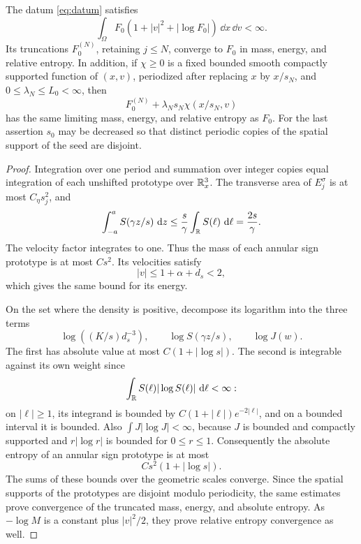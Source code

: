 \begin{lemma}
\label{lem:datum}
The datum \eqref{eq:datum} satisfies
\[
 \int_\Omega F_0(1+|v|^2+|\log F_0|)\,\dd x\,\dd v<\infty .
\]
Its truncations \(F_0^{(N)}\), retaining \(j\le N\), converge to
\(F_0\) in mass, energy, and relative entropy.
In addition, if \(\chi\ge0\) is a fixed bounded smooth compactly
supported function of \((x,v)\), periodized after replacing \(x\)
by \(x/s_N\), and \(0\le\lambda_N\le L_0<\infty\), then
\[
 F_0^{(N)}+\lambda_Ns_N\chi(x/s_N,v)
\]
has the same limiting mass, energy, and relative entropy as \(F_0\).
For the last assertion \(s_0\) may be decreased so that distinct
periodic copies of the spatial support of the seed are disjoint.
\end{lemma}

\begin{proof}
Integration over one period and summation over integer copies equal
integration of each unshifted prototype over \(\mathbb R^3_x\).
The transverse area of \(E_j^\sigma\) is at most \(C_\eta s_j^2\),
and
\[
 \int_{-a}^a S(\gamma z/s)\,\,\mathrm d z
 \le \frac s\gamma\int_\mathbb R S(\ell)\,\,\mathrm d\ell
 =\frac{2s}{\gamma}.
\]
The velocity factor integrates to one.  Thus the mass of each
annular sign prototype is at most \(Cs^2\).
Its velocities satisfy
\[
 |v|\le1+\alpha+d_s<2,
\]
which gives the same bound for its energy.

On the set where the density is positive, decompose its logarithm
into the three terms
\[
 \log((K/s)d_s^{-3}),\qquad
 \log S(\gamma z/s),\qquad \log J(w).
\]
The first has absolute value at most \(C(1+|\log s|)\).
The second is integrable against its own weight since
\[
 \int_\mathbb R S(\ell)|\log S(\ell)|\,\,\mathrm d\ell<\infty:
\]
on \(|\ell|\ge1\), its integrand is bounded by
\(C(1+|\ell|)e^{-2|\ell|}\), and on a bounded interval it is bounded.
Also \(\int J|\log J|<\infty\), because \(J\) is bounded and
compactly supported and \(r|\log r|\) is bounded for \(0\le r\le1\).
Consequently the absolute entropy of an annular sign prototype is
at most
\[
 Cs^2(1+|\log s|).
\]
The sums of these bounds over the geometric scales converge.
Since the spatial supports of the prototypes are disjoint modulo
periodicity, the same estimates prove convergence of the truncated
mass, energy, and absolute entropy.  As \(-\log M\) is a constant
plus \(|v|^2/2\), they prove relative entropy convergence as well.


\end{proof}
